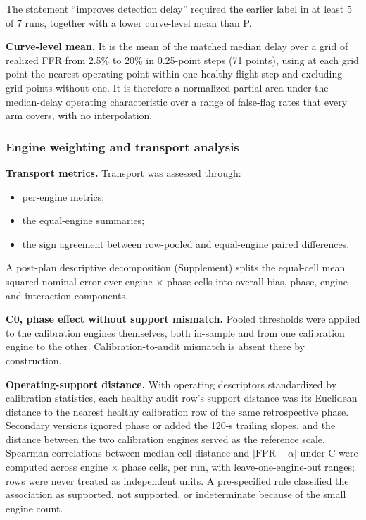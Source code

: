 \documentclass[preprint,11pt,a4paper]{elsarticle}
\begin{document}
The statement ``improves detection delay'' required the earlier label in at least 5 of 7 runs, together with a lower curve-level mean than P.

\textbf{Curve-level mean.} It is the mean of the matched median delay over a grid of realized FFR from 2.5\% to 20\% in 0.25-point steps (71 points), using at each grid point the nearest operating point within one healthy-flight step and excluding grid points without one. It is therefore a normalized partial area under the median-delay operating characteristic over a range of false-flag rates that every arm covers, with no interpolation.

\subsubsection{Engine weighting and transport analysis}

\textbf{Transport metrics.} Transport was assessed through:
\begin{itemize}
\item per-engine metrics;
\item the equal-engine summaries;
\item the sign agreement between row-pooled and equal-engine paired differences.
\end{itemize}

A post-plan descriptive decomposition (Supplement) splits the equal-cell mean squared nominal error over engine × phase cells into overall bias, phase, engine and interaction components.

\textbf{C0, phase effect without support mismatch.} Pooled thresholds were applied to the calibration engines themselves, both in-sample and from one calibration engine to the other. Calibration-to-audit mismatch is absent there by construction.

\textbf{Operating-support distance.} With operating descriptors standardized by calibration statistics, each healthy audit row's support distance was its Euclidean distance to the nearest healthy calibration row of the same retrospective phase. Secondary versions ignored phase or added the 120-s trailing slopes, and the distance between the two calibration engines served as the reference scale. Spearman correlations between median cell distance and $|\mathrm{FPR} - \alpha|$ under C were computed across engine × phase cells, per run, with leave-one-engine-out ranges; rows were never treated as independent units. A pre-specified rule classified the association as supported, not supported, or indeterminate because of the small engine count.
\end{document}

